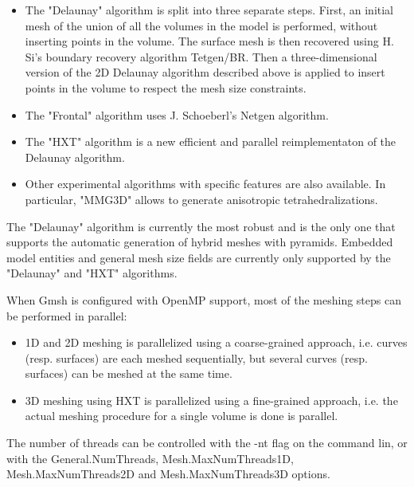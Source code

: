 \documentclass[dvipdfmx, 9pt, a4paper]{article}
\numberwithin{equation}{section}
\begin{document}
\begin{itemize}
\item The "Delaunay" algorithm is split into three separate steps. First, an initial mesh of the union of all the volumes in the model is performed, without inserting points in the volume. The surface mesh is then recovered using H. Si's boundary recovery algorithm Tetgen/BR. Then a three-dimensional version of the 2D Delaunay algorithm described above is applied to insert points in the volume to respect the mesh size constraints.
\item The "Frontal" algorithm uses J. Schoeberl's Netgen algorithm.
\item The "HXT" algorithm is a new efficient and parallel reimplementaton of the Delaunay algorithm.
\item Other experimental algorithms with specific features are also available. In particular, "MMG3D" allows to generate anisotropic tetrahedralizations.
\end{itemize}
The "Delaunay" algorithm is currently the most robust and is the only one that supports the automatic generation of hybrid meshes with pyramids. Embedded model entities and general mesh size fields are currently only supported by the "Delaunay" and "HXT" algorithms.\par
When Gmsh is configured with OpenMP support, most of the meshing steps can be performed in parallel:
\begin{itemize}
\item 1D and 2D meshing is parallelized using a coarse-grained approach, i.e. curves (resp. surfaces) are each meshed sequentially, but several curves (resp. surfaces) can be meshed at the same time.
\item 3D meshing using HXT is parallelized using a fine-grained approach, i.e. the actual meshing procedure for a single volume is done is parallel.
\end{itemize}
The number of threads can be controlled with the -nt flag on the command lin, or with the General.NumThreads, Mesh.MaxNumThreads1D, Mesh.MaxNumThreads2D and Mesh.MaxNumThreads3D options.
\end{document}
